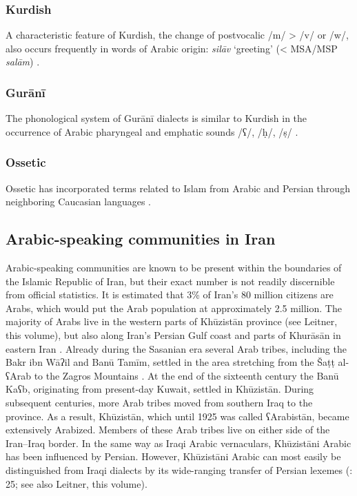 \documentclass[output=paper]{langsci/langscibook}
\begin{document}
\subsubsection{Kurdish}

A characteristic feature of Kurdish, the change of postvocalic /m/ > /v/ or /w/, also occurs frequently in words of Arabic origin: \textit{silāv} ‘greeting’ (< MSA/MSP \textit{salām}) \citep{Paul2008}.

\subsubsection{Gurānī}

The phonological system of Gurānī dialects is similar to Kurdish in the occurrence of Arabic pharyngeal and emphatic sounds /ʕ/, /ḥ/, /ṣ/ \citep{MacKenzie2012}.

\subsubsection{Ossetic}
Ossetic has incorporated terms related to Islam from Arabic and Persian through neighboring Caucasian languages \citep{Thordarson2009}.

\subsection{Arabic-speaking communities in Iran}
Arabic-speaking communities are known to be present within the boundaries of the Islamic Republic of Iran, but their exact number is not readily discernible from official statistics. It is estimated that 3\% of Iran’s 80 million citizens are Arabs, which would put the Arab population at approximately 2.5 million. The majority of Arabs live in the western parts of Khūzistān province (see Leitner, this volume), but also along Iran’s Persian Gulf coast and parts of Khurāsān in eastern Iran \citep{Oberling2011}. Already during the Sasanian era several Arab tribes, including the Bakr ibn Wāʔil and Banū Tamīm, settled in the area stretching from the Šaṭṭ al-ʕArab to the Zagros Mountains \citep{Daniel2011}. At the end of the sixteenth century the Banū Kaʕb, originating from present-day Kuwait, settled in Khūzistān. During subsequent centuries, more Arab tribes moved from southern Iraq to the province. As a result, Khūzistān, which until 1925 was called ʕArabistān, became extensively Arabized. Members of these Arab tribes live on either side of the Iran–Iraq border. In the same way as Iraqi Arabic vernaculars, Khūzistāni Arabic has been influenced by Persian. However, Khūzistāni Arabic can most easily be distinguished from Iraqi dialects by its wide-ranging transfer of Persian lexemes (\citealt{Ingham1997}: 25; see also Leitner, this volume).
\end{document}
